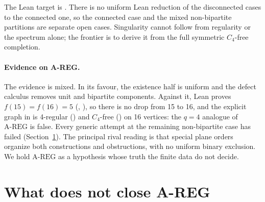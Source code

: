 \documentclass{anvil-paper}
\newcommand{\repobase}{https://github.com/rjwalters/lean-genius/blob/fa2b41268df024128ed4738b3bb500637cf1ec12}
\newcommand{\repofile}[2]{\href{\repobase/#1}{\lean{#2}}}
\newcommand{\AREG}{\mathrm{A\text{-}REG}}
\theoremstyle{definition}
\begin{document}
\noindent The Lean target is . There is no uniform Lean reduction of the disconnected cases to the connected one, so the connected case and the mixed non-bipartite partitions are separate open cases. Singularity cannot follow from regularity or the spectrum alone; the frontier is to derive it from the full symmetric $C_4$-free completion.

\paragraph{Evidence on A-REG.} The evidence is mixed. In its favour, the existence half is uniform and the defect calculus removes unit and bipartite components. Against it, Lean proves $f(15)=f(16)=5$ (, ), so there is no drop from 15 to 16, and the explicit graph  in \repofile{proofs/Proofs/Erdos85Problem.lean}{Erdos85Problem.lean} is 4-regular () and $C_4$-free () on 16 vertices: the $q=4$ analogue of $\AREG$ is false. Every generic attempt at the remaining non-bipartite case has failed (Section~\ref{sec:negative}). The principal rival reading is that special plane orders organize both constructions and obstructions, with no uniform binary exclusion. We hold $\AREG$ as a hypothesis whose truth the finite data do not decide.

\section{What does not close A-REG}\label{sec:negative}
\end{document}
